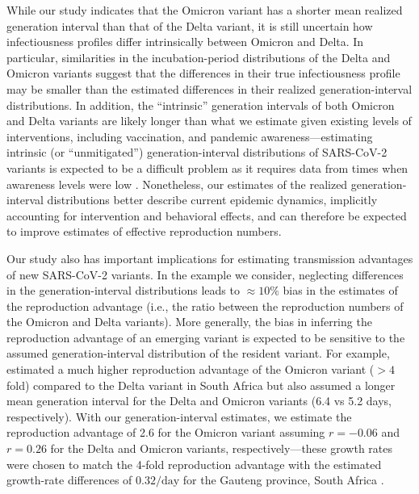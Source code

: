 \documentclass[12pt]{article}
\begin{document}
While our study indicates that the Omicron variant has a shorter mean realized generation interval than that of the Delta variant, it is still uncertain how infectiousness profiles differ intrinsically between Omicron and Delta.
In particular, similarities in the incubation-period distributions of the Delta and Omicron variants suggest that the differences in their true infectiousness profile may be smaller than the estimated differences in their realized generation-interval distributions.
In addition, the ``intrinsic'' generation intervals of both Omicron and Delta variants are likely longer than what we estimate given existing levels of interventions, including vaccination, and pandemic awareness---estimating intrinsic (or ``unmitigated'') generation-interval distributions of SARS-CoV-2 variants is expected to be a difficult problem as it requires data from times when awareness levels were low \citep{sender2021unmitigated}.
Nonetheless, our estimates of the realized generation-interval distributions better describe current epidemic dynamics, implicitly accounting for intervention and behavioral effects,
and can therefore be expected to improve estimates of effective reproduction numbers.

Our study also has important implications for estimating transmission advantages of new SARS-CoV-2 variants.
In the example we consider, neglecting differences in the generation-interval distributions leads to $\approx 10\%$ bias in the estimates of the reproduction advantage (i.e., the ratio between the reproduction numbers of the Omicron and Delta variants).
More generally, the bias in inferring the reproduction advantage of an emerging variant is expected to be sensitive to the assumed generation-interval distribution of the resident variant.
For example, \cite{pearson2021bounding} estimated a much higher reproduction advantage of the Omicron variant ($> 4$ fold) compared to the Delta variant in South Africa but also assumed a longer mean generation interval for the Delta and Omicron variants (6.4 vs 5.2 days, respectively).
With our generation-interval estimates, we estimate the reproduction advantage of 2.6 for the Omicron variant assuming $r=-0.06$ and $r=0.26$ for the Delta and Omicron variants, respectively---these growth rates were chosen to match the 4-fold reproduction advantage with the estimated growth-rate differences of $0.32/\mathrm{day}$ for the Gauteng province, South Africa \cite{pearson2021bounding}.
\end{document}

